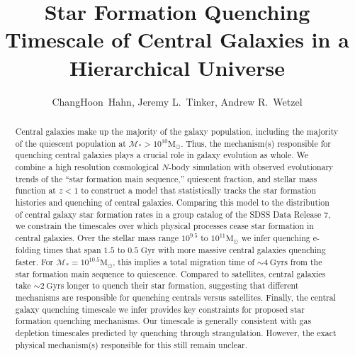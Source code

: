 \documentclass[iop,apj,tighten,twocolappendix,numberedappendix]{emulateapj}
\begin{document}
\title{Star Formation Quenching Timescale of Central Galaxies in a Hierarchical Universe} 

\author{ChangHoon~Hahn, 
Jeremy L.~Tinker, 
Andrew R.~Wetzel}
\begin{abstract}
Central galaxies make up the majority of the galaxy population, 
including the majority of the quiescent population at 
$\mathcal{M}_* > 10^{10}\mathrm{M}_\odot$. Thus, the mechanism(s) 
responsible for quenching central galaxies plays a crucial role 
in galaxy evolution as whole.
We combine a high resolution cosmological $N$-body simulation 
with observed evolutionary trends of the ``star formation main sequence,''
quiescent fraction, and stellar mass function at $z < 1$ to 
construct a model that statistically tracks the star formation 
histories and quenching of central galaxies. 
Comparing this model to the distribution of central galaxy 
star formation rates in a group catalog of the SDSS 
Data Release 7, we constrain the timescales over 
which physical processes cease star formation in central galaxies.
Over the stellar mass range $10^{9.5}$ to $10^{11} \mathrm{M}_\odot$ 
we infer quenching e-folding times that span $1.5$ to $0.5\; \mathrm{Gyr}$ 
with more massive central galaxies quenching faster. 
For $\mathcal{M}_* = 10^{10.5}\mathrm{M}_\odot$, this implies a total
migration time of $\sim 4~\mathrm{Gyrs}$ from the star formation main sequence
to quiescence. Compared to satellites, central galaxies take 
$\sim 2~\mathrm{Gyrs}$ longer to quench their star formation, 
suggesting that different mechanisms are responsible for 
quenching centrals versus satellites. Finally, the central galaxy 
quenching timescale we infer provides key constraints for proposed star formation 
quenching mechanisms. Our timescale is generally consistent 
with gas depletion timescales predicted by quenching through 
strangulation. However, the exact physical mechanism(s) 
responsible for this still remain unclear.
\end{abstract}
\end{document}
